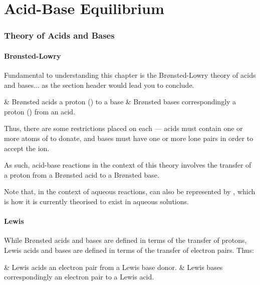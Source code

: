 

\pagebreak
\part{Acid-Base Equilibrium}

	\section{Theory of Acids and Bases}

		\subsection{Brønsted-Lowry}

			Fundamental to understanding this chapter is the Brønsted-Lowry theory of acids and bases... as the section header would lead you
			to conclude.

			\begin{bulletlist}
				& Brønsted acids  a proton () to a base
				& Brønsted bases correspondingly  a proton () from an acid.
			\end{bulletlist}

			Thus, there are some restrictions placed on each --- acids must contain one or more atoms of  to donate, and bases must have
			one or more lone pairs in order to accept the \ch{H+} ion.

			As such, acid-base reactions in the context of this theory involves the transfer of a proton from a Brønsted acid to a Brønsted base.

			Note that, in the context of aqueous reactions,  can also be represented by , which is how it is currently theorised to
			exist in aqueous solutions.


		\subsection{Lewis}

			While Brønsted acids and bases are defined in terms of the transfer of protons, Lewis acids and bases are defined in terms of the
			transfer of electron pairs. Thus:

			\begin{bulletlist}
				& Lewis acids  an electron pair from a Lewis base donor.
				& Lewis bases correspondingly  an electron pair to a Lewis acid.
			\end{bulletlist}

